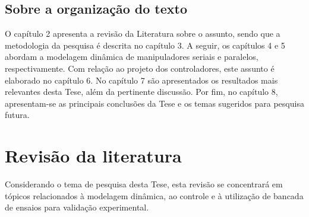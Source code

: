 \documentclass[]{politex}
\begin{document}




\section{Sobre a organização do texto}\label{organizacao}

O capítulo 2 apresenta a revisão da Literatura sobre o assunto, sendo que a metodologia da pesquisa é descrita no capítulo 3. A seguir, os capítulos 4 e 5 abordam a modelagem dinâmica de manipuladores seriais e paralelos, respectivamente. Com relação ao projeto dos controladores, este assunto é elaborado no capítulo 6. No capítulo 7 são apresentados os resultados mais relevantes desta Tese, além da pertinente discussão. Por fim, no capítulo 8, apresentam-se as principais conclusões da Tese e os temas sugeridos para pesquisa futura.

\chapter{Revisão da literatura}\label{revision}

Considerando o tema de pesquisa desta Tese, esta revisão se concentrará em tópicos relacionados à modelagem dinâmica, ao controle e à utilização de bancada de ensaios para validação experimental.
\end{document}
